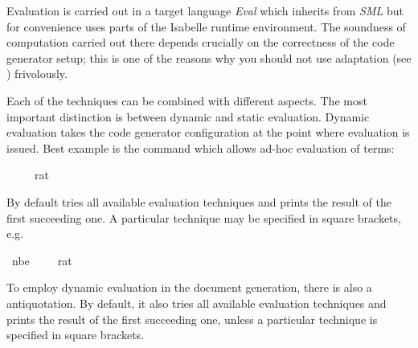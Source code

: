 \begin{isabellebody}
\begin{isamarkuptext}
  Evaluation is carried out in a target language \emph{Eval} which
  inherits from \emph{SML} but for convenience uses parts of the
  Isabelle runtime environment.  The soundness of computation carried
  out there depends crucially on the correctness of the code
  generator setup; this is one of the reasons why you should not use
  adaptation (see ) frivolously.%
\end{isamarkuptext}%
\isamarkuptrue%
%
\isamarkuptrue%
%
\begin{isamarkuptext}%
Each of the techniques can be combined with different aspects.  The
  most important distinction is between dynamic and static evaluation.
  Dynamic evaluation takes the code generator configuration  at the point where evaluation is issued.  Best example is the
  \hypertarget{command.value}{\hyperlink{command.value}{\mbox{}}} command which allows ad-hoc evaluation of
  terms:%
\end{isamarkuptext}%
\isamarkuptrue%
%
\isadelimquote
%
\endisadelimquote
%
\isatagquote
{}\isamarkupfalse%
\ {}{}{}\ {}\ {}{}{}\ {}{}\ rat{}{}%
\endisatagquote
{\isafoldquote}%
%
\isadelimquote
%
\endisadelimquote
%
\begin{isamarkuptext}%
\noindent By default \hyperlink{command.value}{\mbox{}} tries all available evaluation
  techniques and prints the result of the first succeeding one.  A particular
  technique may be specified in square brackets, e.g.%
\end{isamarkuptext}%
\isamarkuptrue%
%
\isadelimquote
%
\endisadelimquote
%
\isatagquote
{}\isamarkupfalse%
\ {}nbe{}\ {}{}{}\ {}\ {}{}{}\ {}{}\ rat{}{}%
\endisatagquote
{\isafoldquote}%
%
\isadelimquote
%
\endisadelimquote
%
\begin{isamarkuptext}%
To employ dynamic evaluation in the document generation, there is also
  a  antiquotation. By default, it also tries all available evaluation
  techniques and prints the result of the first succeeding one, unless a particular
  technique is specified in square brackets.


\end{isamarkuptext}
\end{isabellebody}
